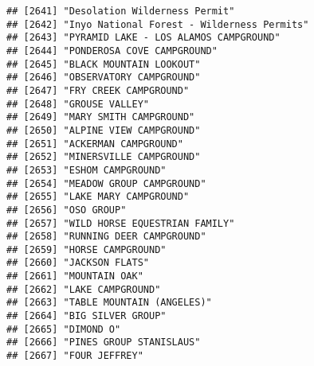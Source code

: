 \documentclass[
]{article}
\begin{document}
\begin{verbatim}
## [2641] "Desolation Wilderness Permit"                                                        
## [2642] "Inyo National Forest - Wilderness Permits"                                           
## [2643] "PYRAMID LAKE - LOS ALAMOS CAMPGROUND"                                                
## [2644] "PONDEROSA COVE CAMPGROUND"                                                           
## [2645] "BLACK MOUNTAIN LOOKOUT"                                                              
## [2646] "OBSERVATORY CAMPGROUND"                                                              
## [2647] "FRY CREEK CAMPGROUND"                                                                
## [2648] "GROUSE VALLEY"                                                                       
## [2649] "MARY SMITH CAMPGROUND"                                                               
## [2650] "ALPINE VIEW CAMPGROUND"                                                              
## [2651] "ACKERMAN CAMPGROUND"                                                                 
## [2652] "MINERSVILLE CAMPGROUND"                                                              
## [2653] "ESHOM CAMPGROUND"                                                                    
## [2654] "MEADOW GROUP CAMPGROUND"                                                             
## [2655] "LAKE MARY CAMPGROUND"                                                                
## [2656] "OSO GROUP"                                                                           
## [2657] "WILD HORSE EQUESTRIAN FAMILY"                                                        
## [2658] "RUNNING DEER CAMPGROUND"                                                             
## [2659] "HORSE CAMPGROUND"                                                                    
## [2660] "JACKSON FLATS"                                                                       
## [2661] "MOUNTAIN OAK"                                                                        
## [2662] "LAKE CAMPGROUND"                                                                     
## [2663] "TABLE MOUNTAIN (ANGELES)"                                                            
## [2664] "BIG SILVER GROUP"                                                                    
## [2665] "DIMOND O"                                                                            
## [2666] "PINES GROUP STANISLAUS"                                                              
## [2667] "FOUR JEFFREY"                                                                        

\end{verbatim}
\end{document}
